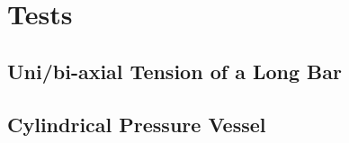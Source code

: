 \section{Tests}
\subsection{Uni/bi-axial Tension of a Long Bar}
\subsection{Cylindrical Pressure Vessel}